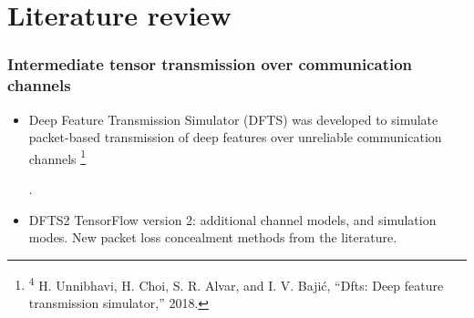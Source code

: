 \documentclass[aspectratio=169]{beamer}
\newcommand\blfootnote[1]{%
	\begingroup
	\renewcommand\thefootnote{}\footnote{#1}%
	\addtocounter{footnote}{-1}%
	\endgroup
}
\begin{document}

\section{Literature review}

\begin{frame}
\frametitle{Intermediate tensor transmission over communication channels}
	\begin{itemize}
	\item Deep Feature Transmission Simulator (DFTS) was developed to simulate packet-based transmission of deep features over unreliable communication channels \blfootnote{\tiny \textsuperscript{4} H. Unnibhavi, H. Choi, S. R. Alvar, and I. V. Bajić, “Dfts: Deep feature transmission simulator,” 2018.} \cite{unnibhavi2018dfts}.
		\item DFTS2 TensorFlow version 2: additional channel models, and simulation modes. New packet loss concealment methods from the literature.
	\end{itemize}
\end{frame}
\end{document}
